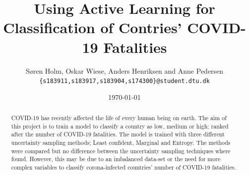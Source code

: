 \documentclass[12pt,fleqn]{article}
\title{\vspace*{-3.75cm} Using Active Learning for Classification of Contries' COVID-19 Fatalities}
\author{Søren Holm, Oskar Wiese, Anders Henriksen and Anne Pedersen \\
	\small {\texttt{\{s183911,s183917,s183904,s174300\}@student.dtu.dk}}}
\date{\today}
\begin{document}
	
	\maketitle
	 
	\begin{abstract} %
		\noindent COVID-19 has recently affected the life of every human being on earth. The aim of this project is to train a model to classify a country as low, medium or high; ranked after the number of COVID-19 fatalities. The model is trained with three different uncertainty sampling methods; Least confident, Marginal and Entropy. The methods were compared but no difference between the uncertainty sampling techniques where found. However, this may be due to an imbalanced data-set or the need for more complex variables to classify corona-infected countries' number of COVID-19 fatalities.
	\end{abstract}
	
\end{document}
